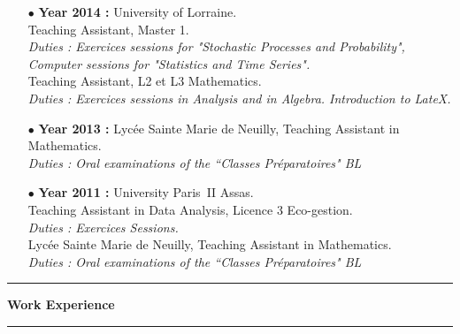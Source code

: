 \documentclass[a4paper,11pt]{article}
\newcommand{\titre}[1]{%
	\begin{center}
	\bigskip
	\rule{\textwidth}{1pt}
	\par\vspace{0.1cm}
        \textbf{\large #1}
	\par\rule{\textwidth}{1pt}
	\end{center}
	\bigskip
	}
\begin{document}
\begin{itemize}
\item[$\bullet$] \textbf{ Year 2014 :}  University of Lorraine.\\
					Teaching Assistant, Master 1. \\
					\textit{Duties : Exercices sessions for "Stochastic Processes and Probability", Computer sessions for "Statistics and Time Series".}\\
					Teaching Assistant, L2 et L3 Mathematics. \\
					\textit{Duties : Exercices sessions in Analysis and in Algebra. Introduction to LateX.}\\
\item[$\bullet$] \textbf{ Year 2013 :} Lycée Sainte Marie de Neuilly, Teaching Assistant in Mathematics. \\
					\textit{Duties : Oral examinations of the ``Classes Préparatoires" BL} \\
\item[$\bullet$] \textbf{ Year 2011 :} University Paris~II Assas.\\
					Teaching Assistant in Data Analysis, Licence 3 Eco-gestion.\\
					\textit{Duties : Exercices Sessions.}\\
					Lycée Sainte Marie de Neuilly, Teaching Assistant in Mathematics. \\
					\textit{Duties : Oral examinations of the ``Classes Préparatoires" BL} 
\end{itemize}

\titre{Work Experience}
\end{document}
